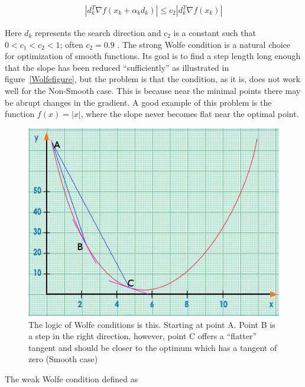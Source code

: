 \begin{equation} \label{strogWolfeq}
  \begin{aligned}
    |d_k^T \nabla f(x_k + \alpha _k d_k)| \leq c_2 |d_k^T \nabla f(x_k)|
  \end{aligned}
\end{equation}

Here $d_k$ represents the search direction and $c_2$ is a constant such that $0 < c_1 < c_2 < 1$; often $c_2 = 0.9$ \citep{nocedal}. The strong Wolfe condition is a natural choice for optimization of smooth functions. Its goal is to find a step length long enough that the slope has been reduced ``sufficiently'' as illustrated in figure~\eqref{Wolfefigure}, but the problem is that the condition, as it is, does not work well for the Non-Smooth case. This is because near the minimal points there may be abrupt changes in the gradient. A good example of this problem is the function $f(x) = |x|$, where the slope never becomes flat near the optimal point.

\begin{figure} 
\begin{center}
\includegraphics[scale=0.65]{Figures/wolfe.png}
\caption[The Idea behind the Wolfe Condition]{The logic of Wolfe conditions is this. Starting at point A. Point B is a step in the right direction, however, point C offers a ``flatter'' tangent and should be closer to the optimum which has a tangent of zero (Smooth case)}
\label{Wolfefigure}
\end{center}
\end{figure}

The weak Wolfe condition defined as

